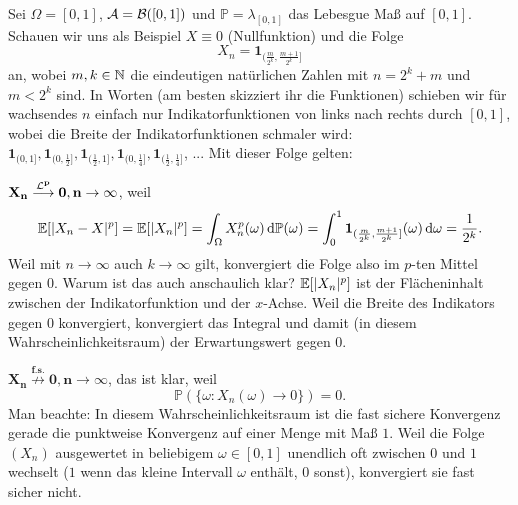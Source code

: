 \begin{beispiel}
	Sei $\Omega = [0,1]$, $\mathcal{A} = \mathcal{B}([0,1])$ und $\mathbb{P} = \lambda_{[0,1]}$ das Lebesgue Ma\ss{} auf $[0,1]$. Schauen wir uns als Beispiel $X \equiv 0$ (Nullfunktion) und die Folge $$X_n=\mathbf{1}_{(\frac{m}{2^k},\frac{m+1}{2^k}]}$$ an, wobei $m,k \in \mathbb{N}$ die eindeutigen nat\"urlichen Zahlen mit $n = 2^k + m$ und $m < 2^k$ sind. In Worten (am besten skizziert ihr die Funktionen) schieben wir f\"ur wachsendes $n$ einfach nur Indikatorfunktionen von links nach rechts durch $[0,1]$, wobei die Breite der Indikatorfunktionen schmaler wird: $\mathbf 1_{(0,1]}, \mathbf 1_{(0,\frac 1 2]}, \mathbf 1_{(\frac 1 2, 1]}, \mathbf 1_{(0,\frac 1 4]}, \mathbf 1_{(\frac 1 2, \frac 1 4]}$, ... 
Mit dieser Folge gelten:\smallskip	
	
	$\mathbf{X_n \overset{\mathcal{L}^p}{\longrightarrow} 0, n \to \infty}$, weil
	\begin{gather*}
		\mathbb{E}[|X_n-X|^p] = \mathbb{E}[|X_n|^p] = \int_{\Omega} X_n^p(\omega) \, \mathrm{d} \mathbb{P}(\omega) = \int_{0}^{1} \mathbf 1_{(\frac{m}{2^k},\frac{m+1}{2^k}]}(\omega) \, \mathrm{d}\omega = \frac{1}{2^k}.
	\end{gather*}
	Weil mit $n\to\infty$ auch $k\to \infty$ gilt, konvergiert die Folge also im $p$-ten Mittel gegen $0$. Warum ist das auch anschaulich klar? $\mathbb{E}[|X_n|^p]$ ist der Fl\"acheninhalt zwischen der Indikatorfunktion und der $x$-Achse. Weil die Breite des Indikators gegen $0$ konvergiert, konvergiert das Integral und damit (in diesem Wahrscheinlichkeitsraum) der Erwartungswert gegen $0$.\smallskip	
	
	$\mathbf{X_n \overset{\text{f.s.}}{\not\longrightarrow} 0, n \to \infty}$, das ist klar, weil
	$$\mathbb{P}(\{ \omega\colon X_n(\omega) \to 0 \}) = 0.$$
	Man beachte: In diesem Wahrscheinlichkeitsraum ist die fast sichere Konvergenz gerade die punktweise Konvergenz auf einer Menge mit Ma\ss{} $1$. Weil die Folge $(X_n)$ ausgewertet in beliebigem $\omega\in [0,1]$ unendlich oft zwischen $0$ und $1$ wechselt ($1$ wenn das kleine Intervall $\omega$ enth\"alt, $0$ sonst), konvergiert sie fast sicher nicht. 
\end{beispiel}

